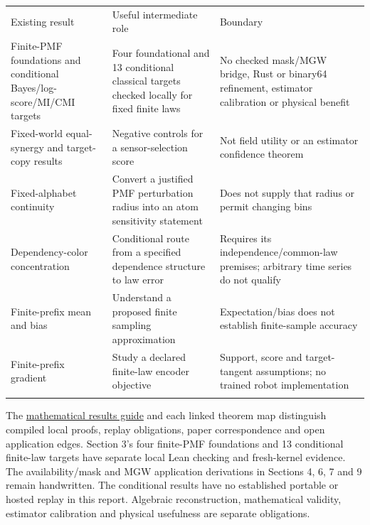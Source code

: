 \documentclass[11pt,a4paper]{article}
\newcounter{none}
\begin{document}
{\def\LTcaptype{none} %
\begin{longtable}[]{@{}
  >{\raggedright\arraybackslash}p{}
  >{\raggedright\arraybackslash}p{}
  >{\raggedright\arraybackslash}p{}@{}}
\toprule\noalign{}
\begin{minipage}[b]{\linewidth}\raggedright
Existing result
\end{minipage} & \begin{minipage}[b]{\linewidth}\raggedright
Useful intermediate role
\end{minipage} & \begin{minipage}[b]{\linewidth}\raggedright
Boundary
\end{minipage} \\*
\midrule\noalign{}
\endhead
\bottomrule\noalign{}
\endfoot
Finite-PMF foundations and conditional Bayes/log-score/MI/CMI targets & Four foundational and 13 conditional classical targets checked locally for fixed finite laws & No checked mask/MGW bridge, Rust or binary64 refinement, estimator calibration or physical benefit \\*
Fixed-world equal-synergy and target-copy results & Negative controls for a sensor-selection score & Not field utility or an estimator confidence theorem \\*
Fixed-alphabet continuity & Convert a justified PMF perturbation radius into an atom sensitivity statement & Does not supply that radius or permit changing bins \\*
Dependency-color concentration & Conditional route from a specified dependence structure to law error & Requires its independence/common-law premises; arbitrary time series do not qualify \\*
Finite-prefix mean and bias & Understand a proposed finite sampling approximation & Expectation/bias does not establish finite-sample accuracy \\*
Finite-prefix gradient & Study a declared finite-law encoder objective & Support, score and target-tangent assumptions; no trained robot implementation \\*
\end{longtable}
}

The \href{https://github.com/sepahead/pid-rs/blob/main/MATHEMATICAL_RESULTS_GUIDE.md}{mathematical results guide} and each linked theorem map distinguish compiled local proofs, replay obligations, paper correspondence and open application edges. Section 3's four finite-PMF foundations and 13 conditional finite-law targets have separate local Lean checking and fresh-kernel evidence. The availability/mask and MGW application derivations in Sections 4, 6, 7 and 9 remain handwritten. The conditional results have no established portable or hosted replay in this report. Algebraic reconstruction, mathematical validity, estimator calibration and physical usefulness are separate obligations.
\end{document}
